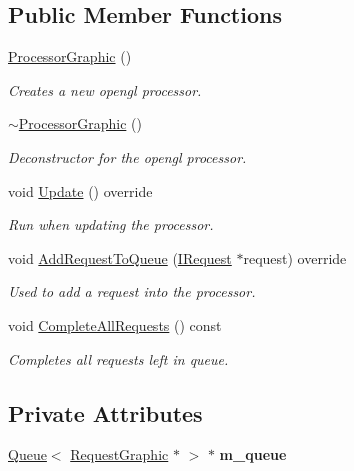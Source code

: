 \subsection*{Public Member Functions}
\begin{DoxyCompactItemize}
\item 
\hyperlink{class_flounder_1_1_processor_graphic_af248462ddd9a4223142b4dd2624d9de4}{Processor\+Graphic} ()
\begin{DoxyCompactList}\small\item\em Creates a new opengl processor. \end{DoxyCompactList}\item 
\hyperlink{class_flounder_1_1_processor_graphic_a2fcd1e4af25dd32a41e092ba62d30480}{$\sim$\+Processor\+Graphic} ()
\begin{DoxyCompactList}\small\item\em Deconstructor for the opengl processor. \end{DoxyCompactList}\item 
void \hyperlink{class_flounder_1_1_processor_graphic_a54cb1365a43270193275ce3794b03b2e}{Update} () override
\begin{DoxyCompactList}\small\item\em Run when updating the processor. \end{DoxyCompactList}\item 
void \hyperlink{class_flounder_1_1_processor_graphic_a238770973388faedded17e5da1347f2b}{Add\+Request\+To\+Queue} (\hyperlink{class_flounder_1_1_i_request}{I\+Request} $\ast$request) override
\begin{DoxyCompactList}\small\item\em Used to add a request into the processor. \end{DoxyCompactList}\item 
void \hyperlink{class_flounder_1_1_processor_graphic_a6833c367831f849aede3871e0d6b4956}{Complete\+All\+Requests} () const
\begin{DoxyCompactList}\small\item\em Completes all requests left in queue. \end{DoxyCompactList}\end{DoxyCompactItemize}
\subsection*{Private Attributes}
\begin{DoxyCompactItemize}
\item 
\mbox{\label{class_flounder_1_1_processor_graphic_ac1ef0e5775089ef8b0568d5b90ba289a}} 
\hyperlink{class_flounder_1_1_queue}{Queue}$<$ \hyperlink{class_flounder_1_1_request_graphic}{Request\+Graphic} $\ast$ $>$ $\ast$ {\bfseries m\+\_\+queue}
\end{DoxyCompactItemize}
